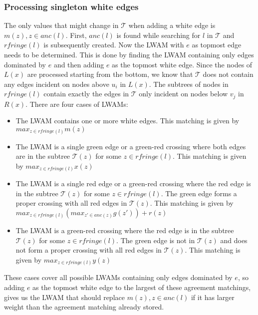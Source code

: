 \subsubsection{Processing singleton white edges}
The only values that might change in $\mathcal{T}$ when adding a white edge is $m(z), z \in anc(l)$. First, $anc(l)$ is found while searching for $l$ in $\mathcal{T}$ and $rfringe(l)$ is subsequently created. Now the LWAM with $e$ as topmost edge needs to be determined. This is done by finding the LWAM containing only edges dominated by $e$ and then adding $e$ as the topmost white edge. Since the nodes of $L(x)$ are processed starting from the bottom, we know that $\mathcal{T}$ does not contain any edges incident on nodes above $u_i$ in $L(x)$. The subtrees of nodes in $rfringe(l)$ contain exactly the edges in $\mathcal{T}$ only incident on nodes below $v_j$ in $R(x)$. %
There are four cases of LWAMs:
\begin{itemize}
	\item The LWAM contains one or more white edges.
	\subitem This matching is given by $max_{z \in rfringe(l)} m(z)$
	\item The LWAM is a single green edge or a green-red crossing where both edges are in the subtree $\mathcal{T}(z)$ for some $z \in rfringe(l)$.
	\subitem This matching is given by $max_{z \in rfringe(l)} x(z)$
	\item The LWAM is a single red edge or a green-red crossing where the red edge is in the subtree $\mathcal{T}(z)$ for some $z \in rfringe(l)$. The green edge forms a proper crossing with all red edges in $\mathcal{T}(z)$.
	\subitem This matching is given by $max_{z \in rfringe(l)} (max_{z' \in anc(z)} g(z')) + r(z)$
	\item The LWAM is a green-red crossing where the red edge is in the subtree $\mathcal{T}(z)$ for some $z \in rfringe(l)$. The green edge is not in $\mathcal{T}(z)$ and does not form a proper crossing with all red edges in $\mathcal{T}(z)$.
	This matching is given by $max_{z \in rfringe(l)} y(z)$
\end{itemize}

These cases cover all possible LWAMs containing only edges dominated by $e$, so adding $e$ as the topmost white edge to the largest of these agreement matchings, gives us the LWAM that should replace $m(z), z \in anc(l)$ if it has larger weight than the agreement matching already stored.

